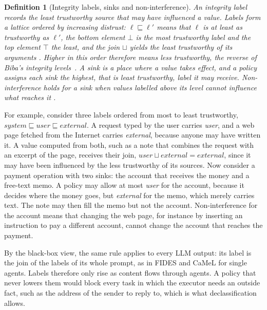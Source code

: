 \documentclass[pdflatex,sn-mathphys-num]{sn-jnl}
\theoremstyle{thmstyleone}%
\theoremstyle{thmstyletwo}%
\theoremstyle{thmstylethree}%
\newtheorem{definition}{Definition}%
\begin{document}
\begin{definition}[Integrity labels, sinks and non-interference]\label{def:label}
An \emph{integrity label} records the least trustworthy source that may have influenced a value. Labels form a lattice ordered by increasing distrust: $\ell \sqsubseteq \ell'$ means that $\ell$ is at least as trustworthy as $\ell'$, the bottom element $\bot$ is the most trustworthy label and the top element $\top$ the least, and the join $\sqcup$ yields the least trustworthy of its arguments \citep{denning1976lattice}. Higher in this order therefore means less trustworthy, the reverse of Biba's integrity levels~\citep{biba1977integrity}. A \emph{sink} is a place where a value takes effect, and a \emph{policy} assigns each sink the highest, that is least trustworthy, label it may receive. \emph{Non-interference} holds for a sink when values labelled above its level cannot influence what reaches it \citep{goguen1982noninterference,sabelfeld2003language}.
\end{definition}

For example, consider three labels ordered from most to least trustworthy, $\textit{system} \sqsubseteq \textit{user} \sqsubseteq \textit{external}$. A request typed by the user carries \textit{user}, and a web page fetched from the Internet carries \textit{external}, because anyone may have written it. A value computed from both, such as a note that combines the request with an excerpt of the page, receives their join, $\textit{user} \sqcup \textit{external} = \textit{external}$, since it may have been influenced by the less trustworthy of its sources. Now consider a payment operation with two sinks: the account that receives the money and a free-text memo. A policy may allow at most \textit{user} for the account, because it decides where the money goes, but \textit{external} for the memo, which merely carries text. The note may then fill the memo but not the account. Non-interference for the account means that changing the web page, for instance by inserting an instruction to pay a different account, cannot change the account that reaches the payment.

By the black-box view, the same rule applies to every LLM output: its label is the join of the labels of its whole prompt, as in FIDES \citep{wu2024ifc} and CaMeL for single agents. Labels therefore only rise as content flows through agents. A policy that never lowers them would block every task in which the executor needs an outside fact, such as the address of the sender to reply to, which is what declassification allows.
\end{document}
